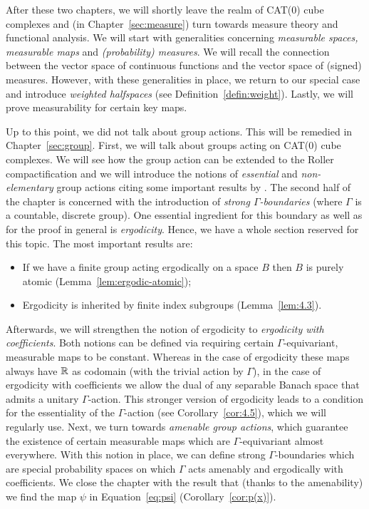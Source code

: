 After these two chapters, we will shortly leave the realm of CAT(0) cube complexes and (in Chapter~\ref{sec:measure}) turn towards measure theory and functional analysis. We will start with generalities concerning \emph{measurable spaces, measurable maps} and \emph{(probability) measures}. We will recall the connection between the vector space of continuous functions and the vector space of (signed) measures. However, with these generalities in place, we return to our special case and introduce \emph{weighted halfspaces} (see Definition~\ref{defin:weight}). Lastly, we will prove measurability for certain key maps. 

Up to this point, we did not talk about group actions. This will be remedied in Chapter~\ref{sec:group}. First, we will talk about groups acting on CAT(0) cube complexes. We will see how the group action can be extended to the Roller compactification and we will introduce the notions of \emph{essential} and \emph{non-elementary} group actions citing some important results by \textcite{Caprace2010}. The second half of the chapter is concerned with the introduction of \emph{strong \(\Gamma\)-boundaries} (where \(\Gamma\) is a countable, discrete group). One essential ingredient for this boundary as well as for the proof in general is \emph{ergodicity}. Hence, we have a whole section reserved for this topic. The most important results are:
\begin{itemize}
\item If we have a finite group acting ergodically on a space \(B\) then \(B\) is purely atomic (Lemma~\ref{lem:ergodic-atomic});
\item Ergodicity is inherited by finite index subgroups (Lemma~\ref{lem:4.3}).
\end{itemize}
Afterwards, we will strengthen the notion of ergodicity to \emph{ergodicity with coefficients}. Both notions can be defined via requiring certain \(\Gamma\)-equivariant, measurable maps to be constant. Whereas in the case of ergodicity these maps always have \(\mathbb{R}\) as codomain (with the trivial action by \(\Gamma\)), in the case of ergodicity with coefficients we allow the dual of any separable Banach space that admits a unitary \(\Gamma\)-action. This stronger version of ergodicity leads to a condition for the essentiality of the \(\Gamma\)-action (see Corollary~\ref{cor:4.5}), which we will regularly use. Next, we turn towards \emph{amenable group actions}, which guarantee the existence of certain measurable maps which are \(\Gamma\)-equivariant almost everywhere. With this notion in place, we can define strong \(\Gamma\)-boundaries which are special probability spaces on which \(\Gamma\) acts amenably and ergodically with coefficients. We close the chapter with the result that (thanks to the amenability) we find the map \(\psi\) in Equation~\eqref{eq:psi} (Corollary~\ref{cor:p(x)}).

